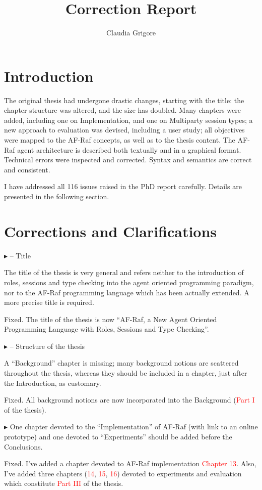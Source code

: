 \documentclass{article}
\title{Correction Report}
\author{Claudia Grigore}
\newcommand*\R[1]{\textcolor{red}{#1}} %
\newenvironment{them}%
  {\bigskip\noindent\begingroup\color{blue}$\blacktriangleright$\enspace}%
  {\endgroup\par}
\begin{document}
\maketitle

\section{Introduction}
The original thesis had undergone drastic changes, starting with the title: the chapter structure was altered, and the size has doubled. Many chapters were added, including one on Implementation, and one on Multiparty session types; a new approach to evaluation was devised, including a user study; all objectives were mapped to the AF-Raf concepts, as well as to the thesis content. The AF-Raf agent architecture is described both textually and in a graphical format. Technical errors were inspected and corrected. Syntax and semantics are correct and consistent.

I have addressed all 116 issues raised in the PhD report carefully.
Details are presented in the following section.

\section{Corrections and Clarifications}

\begin{them}
-- Title

The title of the thesis is very general and refers neither to the introduction
of roles, sessions and type checking into the agent oriented programming
paradigm, nor to the AF-Raf programming language which has been actually
extended. A more precise title is required.
\end{them}
Fixed. The title of the thesis is now ``AF-Raf, a New Agent Oriented Programming
Language with Roles, Sessions and Type Checking''.

\begin{them}
-- Structure of the thesis

A ``Background'' chapter is missing; many background notions are scattered
throughout the thesis, whereas they should be included in a chapter, just after
the Introduction, as customary.
\end{them}
Fixed. All background notions are now incorporated into the Background (\R{Part
I} of the thesis).

\begin{them}
One chapter devoted to the ``Implementation'' of AF-Raf (with link to an online
prototype) and one devoted to ``Experiments'' should be added before the
Conclusions.
\end{them}
Fixed. I've added a chapter devoted to AF-Raf implementation \R{Chapter 13}.
Also, I've added three chapters (\R{14}, \R{15}, \R{16}) devoted to experiments
and evaluation which constitute \R{Part III} of the thesis.
\end{document}
